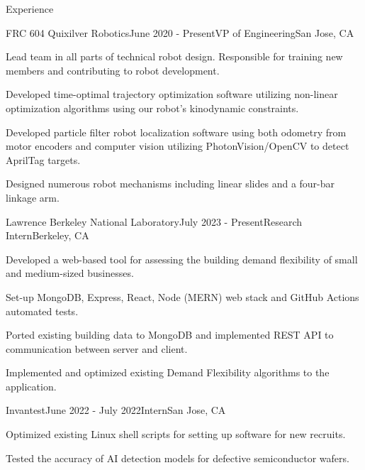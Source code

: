 \documentclass[
	11pt, %
]{resume} %
\begin{document}
\begin{rSection}{Experience}

	\begin{rSubsection}{FRC 604 Quixilver Robotics}{June 2020 - Present}{VP of Engineering}{San Jose, CA}
		\item Lead team in all parts of technical robot design. Responsible for training new members and contributing to robot development.
        \item Developed time-optimal trajectory optimization software utilizing non-linear optimization algorithms using our robot’s kinodynamic constraints.
        \item Developed particle filter robot localization software using both odometry from motor encoders and computer vision utilizing PhotonVision/OpenCV to detect AprilTag targets.
        \item Designed numerous robot mechanisms including linear slides and a four-bar linkage arm.
        
	\end{rSubsection}


	\begin{rSubsection}{Lawrence Berkeley National Laboratory}{July 2023 - Present}{Research Intern}{Berkeley, CA}
		\item Developed a web-based tool for assessing the building demand flexibility of small and medium-sized businesses.
		\item Set-up MongoDB, Express, React, Node (MERN) web stack and GitHub Actions automated tests.
        \item Ported existing building data to MongoDB and implemented REST API to communication between server and client.
        \item Implemented and optimized existing Demand Flexibility algorithms to the application.
        
	\end{rSubsection}


	\begin{rSubsection}{Invantest}{June 2022 - July 2022}{Intern}{San Jose, CA}
		\item Optimized existing Linux shell scripts for setting up software for new recruits.
		\item Tested the accuracy of AI detection models for defective semiconductor wafers.
	\end{rSubsection}


\end{rSection}
\end{document}
